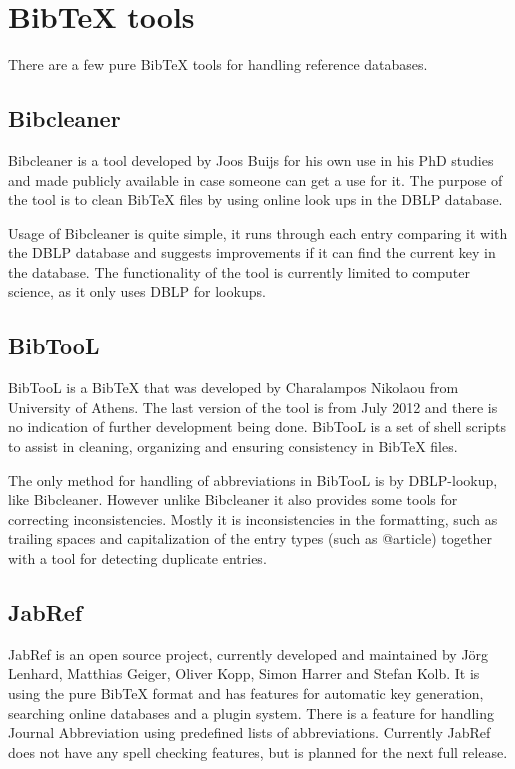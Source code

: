 \section{Bib{\TeX} tools}
There are a few pure Bib{\TeX} tools for handling reference databases.

\subsection{Bibcleaner}
Bibcleaner is a tool developed by Joos Buijs for his own use in his
PhD studies and made publicly available in case someone can get a use
for it.  The purpose of the tool is to clean Bib{\TeX} files by using
online look ups in the DBLP database\cite{bibcleaner_question,
  bibcleaner_source}.

Usage of Bibcleaner is quite simple, it runs through each entry
comparing it with the DBLP database and suggests improvements if it
can find the current key in the database.  The functionality of the
tool is currently limited to computer science, as it only uses DBLP
for lookups\cite{bibcleaner_source}.

\subsection{BibTooL}
BibTooL is a Bib{\TeX} that was developed by Charalampos Nikolaou from
University of Athens.  The last version of the tool is from July 2012
and there is no indication of further development being done.  BibTooL
is a set of shell scripts to assist in cleaning, organizing and
ensuring consistency in Bib{\TeX} files\cite{bibtool_site}.

The only method for handling of abbreviations in BibTooL is by
DBLP-lookup, like Bibcleaner.  However unlike Bibcleaner it also
provides some tools for correcting inconsistencies.  Mostly it is
inconsistencies in the formatting, such as trailing spaces and
capitalization of the entry types (such as @article) together with a
tool for detecting duplicate entries.

\subsection{JabRef}
JabRef is an open source project, currently developed and maintained
by Jörg Lenhard, Matthias Geiger, Oliver Kopp, Simon Harrer and Stefan
Kolb\cite{jabref_developers}.  It is using the pure Bib{\TeX} format
and has features for automatic key generation, searching online
databases and a plugin system\cite{jabref_features}.  There is a
feature for handling Journal Abbreviation using predefined lists of
abbreviations\cite{jabref_abbreviations}.  Currently JabRef does not
have any spell checking features, but is planned for the next full
release\cite{jabref_spellchecker}.


